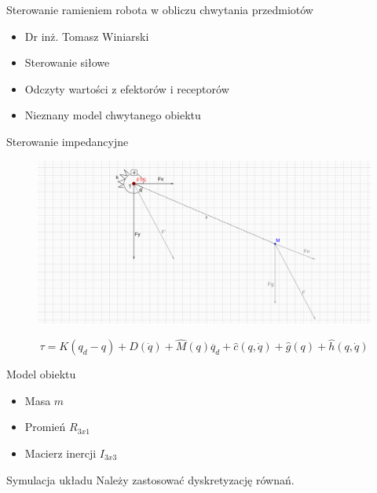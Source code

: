 \documentclass{beamer}
\begin{document}
\begin{frame}{Sterowanie ramieniem robota w obliczu chwytania przedmiotów}

\begin{itemize}
	\item Dr inż. Tomasz Winiarski
\end{itemize}

\begin{itemize}
	\item Sterowanie siłowe
	\item Odczyty wartości z efektorów i receptorów
	\item Nieznany model chwytanego obiektu
\end{itemize}
\end{frame}



\begin{frame}{Sterowanie impedancyjne}
	\begin{figure}[h]
		\centering
		\includegraphics[scale=1.30]{2d}
	\end{figure}

	\begin{equation}
	\tau = K(q_d-q) + D(\dot{q}) + \hat{M}(q)\ddot{q_d} + \hat{c}(q, \dot{q}) + \hat{g}(q) + \hat{h}(q, \dot{q})
	\end{equation}
\end{frame}

\begin{frame}{Model obiektu}
\begin{itemize}
	\item Masa $m$
	\item Promień $R_{3x1}$
	\item Macierz inercji $I_{3x3}$
\end{itemize}
\end{frame}

\begin{frame}{Symulacja układu}
	Należy zastosować dyskretyzację równań.
	
\end{frame}
\end{document}
